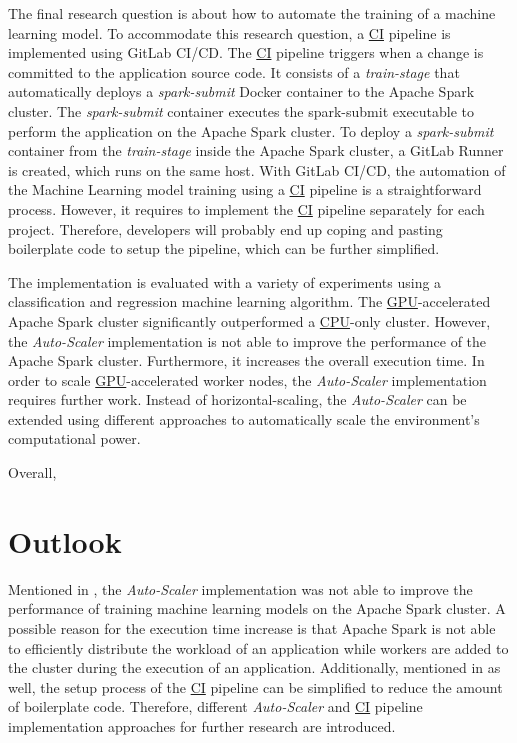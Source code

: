 The final research question is about how to automate the training of a machine learning model.
%
To accommodate this research question, a \hyperlink{abbr:ci}{CI} pipeline is implemented using GitLab CI/CD. The \hyperlink{abbr:ci}{CI} pipeline triggers when a change is committed to the application source code.
It consists of a \textit{train-stage} that automatically deploys a \textit{spark-submit} Docker container to the Apache Spark cluster.
The \textit{spark-submit} container executes the spark-submit executable to perform the application on the Apache Spark cluster.
To deploy a \textit{spark-submit} container from the \textit{train-stage} inside the Apache Spark cluster, a GitLab Runner is created, which runs on the same host.
With GitLab CI/CD, the automation of the Machine Learning model training using a \hyperlink{abbr:ci}{CI} pipeline is a straightforward process. However, it requires to implement the \hyperlink{abbr:ci}{CI} pipeline separately for each project. Therefore, developers will probably end up coping and pasting boilerplate code to setup the pipeline, which can be further simplified.


The implementation is evaluated with a variety of experiments using a classification and regression machine learning algorithm.
The \hyperlink{abbr:gpu}{GPU}-accelerated Apache Spark cluster significantly outperformed a \hyperlink{abbr:cpu}{CPU}-only cluster.
However, the \textit{Auto-Scaler} implementation is not able to improve the performance of the Apache Spark cluster. Furthermore, it increases the overall execution time. In order to scale \hyperlink{abbr:gpu}{GPU}-accelerated worker nodes, the \textit{Auto-Scaler} implementation requires further work. Instead of horizontal-scaling, the \textit{Auto-Scaler} can be extended using different approaches to automatically scale the environment's computational power.

Overall, 


\section{Outlook}
Mentioned in , the \textit{Auto-Scaler} implementation was not able to improve the performance of training machine learning models on the Apache Spark cluster.
A possible reason for the execution time increase is that Apache Spark is not able to efficiently distribute the workload of an application while workers are added to the cluster during the execution of an application.
Additionally, mentioned in  as well, the setup process of the \hyperlink{abbr:ci}{CI} pipeline can be simplified to reduce the amount of boilerplate code.
Therefore, different \textit{Auto-Scaler} and \hyperlink{abbr:ci}{CI} pipeline implementation approaches for further research are introduced.



